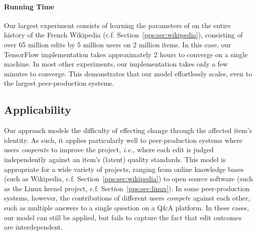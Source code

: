 \paragraph{Running Time}
Our largest experiment consists of learning the parameters of  on the entire history of the French Wikipedia (c.f. Section~\ref{pps:sec:wikipedia}), consisting of over \num{65} million edits by \num{5} million users on \num{2} million items.
In this case, our TensorFlow implementation takes approximately \num{2} hours to converge on a single machine.
In most other experiments, our implementation takes only a few minutes to converge.
This demonstrates that our model effortlessly scales, even to the largest peer-production systems.

\subsection{Applicability}
Our approach models the difficulty of effecting change through the affected item's identity.
As such, it applies particularly well to peer-production systems where users \emph{cooperate} to improve the project, \textit{i.e.}, where each edit is judged independently against an item's (latent) quality standards.
This model is appropriate for a wide variety of projects, ranging from online knowledge bases (such as Wikipedia, c.f. Section~\ref{pps:sec:wikipedia}) to open source software (such as the Linux kernel project, c.f. Section~\ref{pps:sec:linux}).
In some peer-production systems, however, the contributions of different users \emph{compete} against each other, such as multiple answers to a single question on a Q\&A platform.
In these cases, our model can still be applied, but fails to capture the fact that edit outcomes are interdependent.
